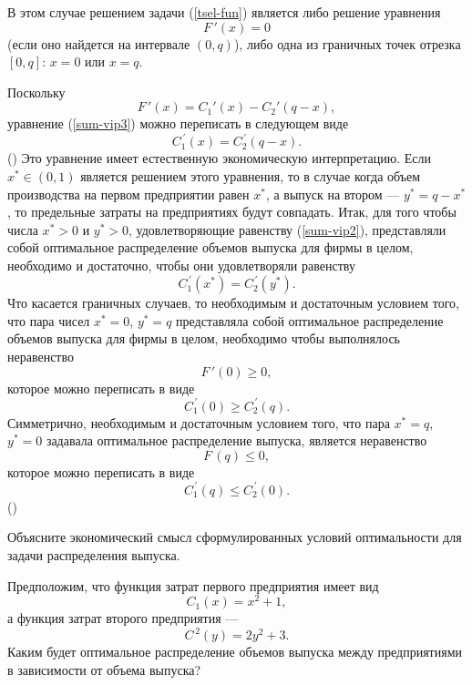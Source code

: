  В этом случае решением задачи (\ref{tsel-fun}) является либо решение уравнения
\begin{equation}
    \label{sum-vip3}
    F\,'(x)=0
\end{equation}
    (если оно найдется на интервале $(0,q)$), либо одна из граничных
    точек отрезка $[0,q]$: $x=0$ или $x=q$.

    Поскольку
    \[F\,'(x)=C_{1}'(x)-C_{2}'(q-x),\]
    уравнение (\ref{sum-vip3}) можно переписать в следующем виде
    \[C^{\,\prime}_{1}(x)=C^{\,\prime}_{2}(q-x).\]                 ()
    Это уравнение имеет естественную экономическую интерпретацию.
    Если $x^{*}\in(0,1)$ является решением этого уравнения, то в случае когда
    объем производства на первом предприятии равен $x^{*}$, а выпуск на
    втором --- $y^{*}=q-x^{*}$, то предельные затраты на предприятиях будут совпадать.
    Итак, для того чтобы числа $x^{*}>0$ и $y^{*}>0$, удовлетворяющие равенству (\ref{sum-vip2}),
    представляли собой оптимальное распределение объемов выпуска для фирмы
    в целом, необходимо и достаточно, чтобы они удовлетворяли равенству
    \[C_{1}^{\,\prime}(x^{*})=C_{2}^{\,\prime}(y^{*}).\]
    Что касается граничных случаев, то необходимым и достаточным условием того, что пара
    чисел $x^{*}=0$, $y^{*}=q$ представляла собой оптимальное распределение объемов
    выпуска для фирмы в целом, необходимо чтобы выполнялось неравенство
    \[F\,'(0)\geqslant0,\]
    которое можно переписать в виде
    \[C_{1}^{\,\prime}(0)\geqslant C_{2}^{\,\prime}(q).\]
    Симметрично, необходимым и достаточным условием того, что пара
    $x^{*}=q$, $y^{*}=0$ задавала
    оптимальное распределение выпуска, является неравенство
    \[F\,(q)\leqslant0,\]
    которое можно переписать в виде
    \[C_{1}^{\,\prime}(q)\leqslant C_{2}^{\,\prime}(0).\]         ()

\begin{exer}
    Объясните экономический смысл сформулированных условий
оптимальности для задачи распределения выпуска.
\end{exer}

\begin{exer}
    Предположим, что функция затрат первого предприятия имеет вид
    \[C_{1}(x)=x^{2}+1,\]
    а функция затрат второго предприятия ---
    \[C^{\,2}(y)=2y^{2}+3.\]
    Каким будет оптимальное распределение объемов выпуска между
    предприятиями в зависимости от объема выпуска?
\end{exer}

